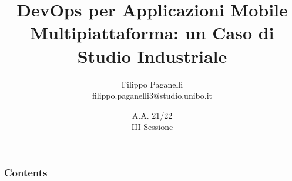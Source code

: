 \documentclass[10pt]{beamer}
\title[]{DevOps per Applicazioni Mobile Multipiattaforma: un Caso di Studio Industriale}
\institute[]{Alma Mater Studiorum - Università di Bologna \\ Campus di Cesena}
\author[Filippo Paganelli]{Filippo Paganelli \\ filippo.paganelli3@studio.unibo.it}
\date[\textcolor{white}{A.A. 21/22} ]
{A.A. 21/22 \\ III Sessione}
\begin{document}
\frame{\titlepage}
\begin{frame}
\frametitle{Contents}
\tableofcontents
\end{frame}

%

%

%
\end{document}
